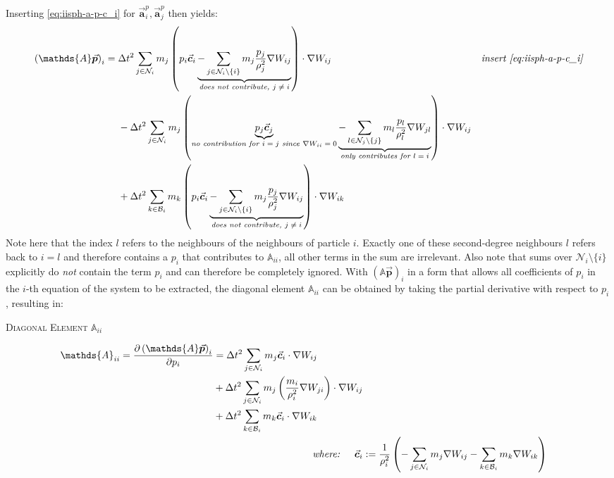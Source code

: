 \documentclass[oneside, a4paper]{book}
\newcommand{\equationnamed}[2]{%
  \setlength{\fboxsep}{2pt} %
  \setlength{\fboxrule}{0.01pt}
  \begin{center}
    \begin{minipage}{\textwidth}
      \begin{center}\textsc{#1}\end{center}
      #2
    \end{minipage}
  \end{center}
}
\newcommand\vek[1]{\vec{\bm{#1}}}
\newcommand\br[1]{\left(#1\right)}
\begin{document}
    Inserting \autoref{eq:iisph-a-p-c_i} for $\vek{a}_i^p, \vek{a}_j^p$ then yields:
    \begin{align*}
      \br{\mathds{A}\vek{p}}_{i}={}
        &\Delta t^2 \sum_{j\in\mathcal{N}_i} m_j 
         \br{p_i \vek{c}_i 
         \underbrace{- \sum_{j\in\mathcal{N}_i\setminus\{i\}} m_j\frac{p_j}{\rho_j^2} \nabla W_{ij}}_{\textit{does not contribute, $j\neq i$}}
         } 
         \cdot \nabla W_{ij}
         &\textit{insert \autoref{eq:iisph-a-p-c_i}}\\
       &-\Delta t^2 \sum_{j\in\mathcal{N}_i} m_j 
         \br{
           \underbrace{p_j \vek{c}_j}_{\textit{no contribution for $i=j$ since $\nabla W_{ii}=0$}}
           \underbrace{- \sum_{l\in\mathcal{N}_j\setminus\{j\}} m_l\frac{p_l}{\rho_l^2} \nabla W_{jl}}_{\textit{only contributes for $l=i$}}
         }
         \cdot \nabla W_{ij}
         &{}\\
       &+\Delta t^2 \sum_{k\in\mathcal{B}_i} m_k 
         \br{p_i \vek{c}_i 
           \underbrace{- \sum_{j\in\mathcal{N}_i\setminus\{i\}} m_j\frac{p_j}{\rho_j^2} \nabla W_{ij}}_{\textit{does not contribute, $j\neq i$}}
         } 
         \cdot \nabla W_{ik}
         &{}
    \end{align*}
    Note here that the index $l$ refers to the neighbours of the neighbours of particle $i$. Exactly one of these second-degree neighbours $l$ refers back to $i=l$ and therefore contains a $p_i$ that contributes to $\mathds{A}_{ii}$, all other terms in the sum are irrelevant. Also note that sums over $\mathcal{N}_i\setminus\{i\}$ explicitly do \textit{not} contain the term $p_i$ and can therefore be completely ignored. With $\br{\mathds{A}\vek{p}}_i$ in a form that allows all coefficients of $p_i$ in the $i$-th equation of the system to be extracted, the diagonal element $\mathds{A}_{ii}$ can be obtained by taking the partial derivative with respect to $p_i$, resulting in:
    \equationnamed{Diagonal Element $\mathds{A}_{ii}$}{
      \begin{align}
        \begin{split}
          \mathds{A}_{ii} = \frac{\partial \br{\mathds{A}\vek{p}}_i}{\partial p_i} &=\Delta t^2\sum_{j\in\mathcal{N}_i} m_j \vek{c}_i \cdot \nabla W_{ij}\\
          &+ \Delta t^2 \sum_{j\in\mathcal{N}_i} m_j \br{
             \frac{m_i}{\rho_i^2}\nabla W_{ji}
          } \cdot \nabla W_{ij}\\
          &+\Delta t^2 \sum_{k\in\mathcal{B}_i} m_k 
            \vek{c}_i
          \cdot \nabla W_{ik}
        \end{split}\label{eq:iisph-diagonal-element}\\
        \textit{where: \quad}\vek{c}_i &:= \frac{1}{\rho_i^2}\br{-\sum_{j\in\mathcal{N}_i} 
        m_j \nabla W_{ij} 
       -\sum_{k\in\mathcal{B}_i} 
        m_k \nabla W_{ik} }
      \end{align}
    }
    
\end{document}
